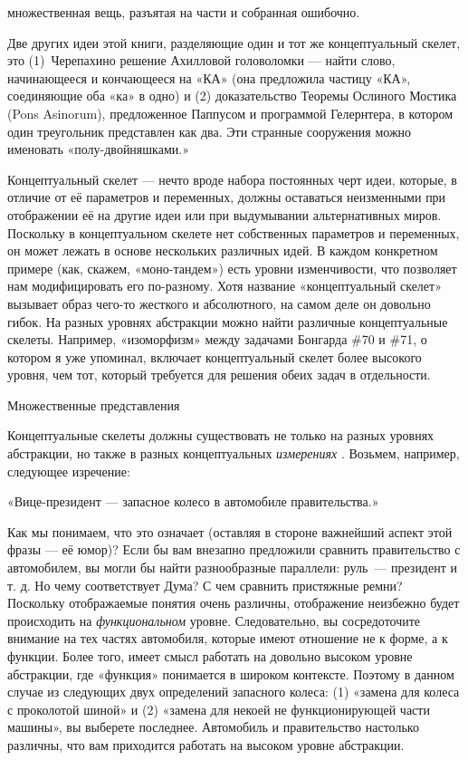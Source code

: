 \documentclass[../main.tex]{subfiles}
\begin{document}
множественная вещь, разъятая на части и собранная ошибочно.

Две других идеи этой книги, разделяющие один и тот же концептуальный скелет, это (1)~Черепахино решение Ахилловой головоломки --- найти слово, начинающееся и кончающееся на «КА» (она предложила частицу «КА», соединяющие оба «ка» в одно) и (2) доказательство Теоремы Ослиного Мостика (Pons Asinorum), предложенное Паппусом и программой Гелернтера, в котором один треугольник представлен как два. Эти странные сооружения можно именовать «полу-двойняшками.»

Концептуальный скелет --- нечто вроде набора постоянных черт идеи, которые, в отличие от её параметров и переменных, должны оставаться неизменными при отображении её на другие идеи или при выдумывании альтернативных миров. Поскольку в концептуальном скелете нет собственных параметров и переменных, он может лежать в основе нескольких различных идей. В каждом конкретном примере (как, скажем, «моно-тандем») есть уровни изменчивости, что позволяет нам модифицировать его по-разному. Хотя название «концептуальный скелет» вызывает образ чего-то жесткого и абсолютного, на самом деле он довольно гибок. На разных уровнях абстракции можно найти различные концептуальные скелеты. Например, «изоморфизм» между задачами Бонгарда \#70 и \#71, о котором я уже упоминал, включает концептуальный скелет более высокого уровня, чем тот, который требуется для решения обеих задач в отдельности.

Множественные представления

Концептуальные скелеты должны существовать не только на разных уровнях абстракции, но также в разных концептуальных \emph{измерениях} . Возьмем, например, следующее изречение:

«Вице-президент --- запасное колесо в автомобиле правительства.»

Как мы понимаем, что это означает (оставляя в стороне важнейший аспект этой фразы --- её юмор)? Если бы вам внезапно предложили сравнить правительство с автомобилем, вы могли бы найти разнообразные параллели: руль~--- президент и т. д. Но чему соответствует Дума? С чем сравнить пристяжные ремни? Поскольку отображаемые понятия очень различны, отображение неизбежно будет происходить на \emph{функциональном} уровне. Следовательно, вы сосредоточите внимание на тех частях автомобиля, которые имеют отношение не к форме, а к функции. Более того, имеет смысл работать на довольно высоком уровне абстракции, где «функция» понимается в широком контексте. Поэтому в данном случае из следующих двух определений запасного колеса: (1) «замена для колеса с проколотой шиной» и (2) «замена для некоей не функционирующей части машины», вы выберете последнее. Автомобиль и правительство настолько различны, что вам приходится работать на высоком уровне абстракции.
\end{document}
